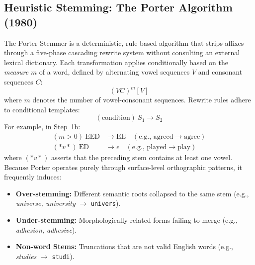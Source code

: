 \subsection{Heuristic Stemming: The Porter Algorithm (1980)}
The Porter Stemmer is a deterministic, rule-based algorithm that strips affixes through a five-phase cascading rewrite system without consulting an external lexical dictionary. Each transformation applies conditionally based on the \textit{measure} $m$ of a word, defined by alternating vowel sequences $V$ and consonant sequences $C$:
\begin{equation}
    [C](VC)^m[V]
\end{equation}
where $m$ denotes the number of vowel-consonant sequences. Rewrite rules adhere to conditional templates:
\begin{equation}
    (\text{condition})\ S_1 \to S_2
\end{equation}
For example, in Step~1b:
\begin{align}
    (m > 0)\ \text{EED} &\to \text{EE} \quad (\text{e.g., agreed} \to \text{agree}) \\
    (*v*)\ \text{ED} &\to \epsilon \quad (\text{e.g., played} \to \text{play})
\end{align}
where $(*v*)$ asserts that the preceding stem contains at least one vowel. Because Porter operates purely through surface-level orthographic patterns, it frequently induces:
\begin{itemize}
    \item \textbf{Over-stemming:} Different semantic roots collapsed to the same stem (e.g., \textit{universe, university} $\to$ \texttt{univers}).
    \item \textbf{Under-stemming:} Morphologically related forms failing to merge (e.g., \textit{adhesion, adhesive}).
    \item \textbf{Non-word Stems:} Truncations that are not valid English words (e.g., \textit{studies} $\to$ \texttt{studi}).
\end{itemize}

